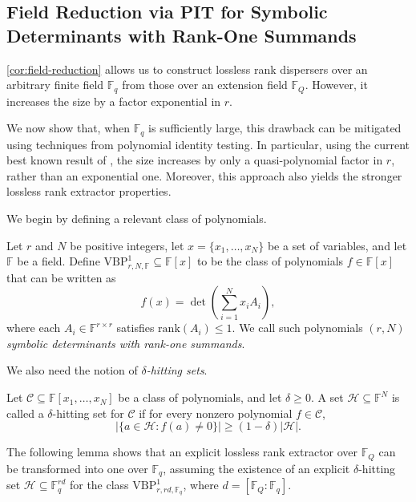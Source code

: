 \documentclass[11pt]{article}
\newcommand{\rank}{\mathrm{rank}}
\newcommand{\F}{\mathbb{F}}
\newcommand{\VBP}{\mathrm{VBP}}
\newcommand{\VP}[3]{\VBP_{#1,#2,#3}^1}
\begin{document}
\subsection{Field Reduction via PIT for Symbolic Determinants with Rank-One Summands}\label{sec:pit}

\cref{cor:field-reduction} allows us to construct lossless rank dispersers over an arbitrary finite field $\F_q$ from those over an extension field $\F_Q$. However, it increases the size by a factor exponential in $r$.

We now show that, when $\F_q$ is sufficiently large, this drawback can be mitigated using techniques from polynomial identity testing. In particular, using the current best known result of \cite{DBLP:journals/cc/GurjarT20}, the size increases by only a quasi-polynomial factor in $r$, rather than an exponential one. Moreover, this approach also yields the stronger lossless rank extractor properties.

We begin by defining a relevant class of polynomials.

\begin{definition}
Let $r$ and $N$ be positive integers, let $x=\{x_1,\dots,x_N\}$ be a set of variables, and let $\F$ be a field. 
Define $\VP{r}{N}{\F}\subseteq \F[x]$ to be the class of polynomials $f\in \F[x]$ that can be written as
\[
f(x)=\det\!\left(\sum_{i=1}^N x_i A_i\right),
\]
where each $A_i\in \F^{r\times r}$ satisfies $\rank(A_i)\le 1$.
We call such polynomials \emph{$(r,N)$ symbolic determinants with rank-one summands}.  
\end{definition}

We also need the notion of \emph{$\delta$-hitting sets}.

\begin{definition}
Let $\mathcal{C}\subseteq \F[x_1,\dots,x_N]$ be a class of polynomials, and let $\delta\geq 0$. A set $\mathcal{H}\subseteq \F^{N}$ is called a $\delta$-hitting set for $\mathcal{C}$ if for every nonzero polynomial $f\in \mathcal{C}$,
\[
\bigl|\{a\in \mathcal{H} : f(a)\neq 0\}\bigr|\ge (1-\delta)|\mathcal{H}|.
\]
\end{definition}

The following lemma shows that an explicit lossless rank extractor over $\F_Q$ can be transformed into one over $\F_q$, assuming the existence of an explicit $\delta$-hitting set $\mathcal{H}\subseteq \F_q^{rd}$ for the class $\VP{r}{rd}{\F_q}$, where $d=[\F_Q:\F_q]$.
\end{document}
